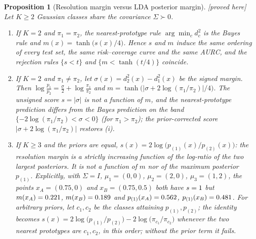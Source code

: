 \documentclass[10pt,a4paper]{article}
\theoremstyle{plain}
\newtheorem{proposition}[theorem]{Proposition}
\theoremstyle{definition}
\theoremstyle{remark}
\newcommand{\Sig}{\Sigma}
\newcommand{\status}[1]{\textsf{\small [#1]}}
\newcommand{\dd}{d^2}
\begin{document}
\begin{proposition}[Resolution margin versus LDA posterior margin]\label{prop:lda} \status{proved here}
Let $K\ge2$ Gaussian classes share the covariance $\Sig\succ0$.
\begin{enumerate}[leftmargin=2em,label=(\roman*)]
\item If $K=2$ and $\pi_1=\pi_2$, the nearest-prototype rule $\arg\min_c\dd_c$ is the Bayes rule and
$m(x)=\tanh\!\big(s(x)/4\big)$. Hence $s$ and $m$ induce the same ordering of every test set, the same risk--coverage curve and the same AURC, and the rejection rules $\{s<t\}$ and $\{m<\tanh(t/4)\}$ coincide.
\item If $K=2$ and $\pi_1\neq\pi_2$, let $\sigma(x)=\dd_2(x)-\dd_1(x)$ be the signed margin. Then $\log\frac{p_1}{p_2}=\frac{\sigma}{2}+\log\frac{\pi_1}{\pi_2}$ and $m=\tanh\big(|\sigma+2\log(\pi_1/\pi_2)|/4\big)$. The unsigned score $s=|\sigma|$ is not a function of $m$, and the nearest-prototype prediction differs from the Bayes prediction on the band $\{-2\log(\pi_1/\pi_2)<\sigma<0\}$ (for $\pi_1>\pi_2$); the prior-corrected score $|\sigma+2\log(\pi_1/\pi_2)|$ restores (i).
\item If $K\ge3$ and the priors are equal, $s(x)=2\log\big(p_{(1)}(x)/p_{(2)}(x)\big)$: the resolution margin is a strictly increasing function of the log-ratio of the two largest posteriors. It is \emph{not} a function of $m$ nor of the maximum posterior $p_{(1)}$. Explicitly, with $\Sig=I$, $\mu_1=(0,0)$, $\mu_2=(2,0)$, $\mu_3=(1,2)$, the points $x_A=(0.75,0)$ and $x_B=(0.75,0.5)$ both have $s=1$ but $m(x_A)=0.221$, $m(x_B)=0.189$ and $p_{(1)}(x_A)=0.562$, $p_{(1)}(x_B)=0.481$. For arbitrary priors, let $c_1,c_2$ be the classes attaining $p_{(1)},p_{(2)}$; the identity becomes $s(x)=2\log\big(p_{(1)}/p_{(2)}\big)-2\log\big(\pi_{c_1}/\pi_{c_2}\big)$ whenever the two nearest prototypes are $c_1,c_2$, in this order; without the prior term it fails.
\end{enumerate}
\end{proposition}
\end{document}
